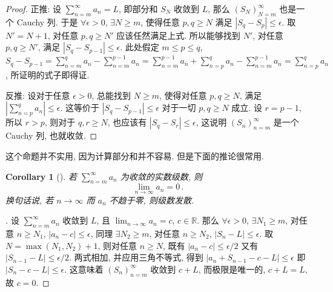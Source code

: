 \documentclass[UTF8]{ctexart}
\theoremstyle{mystyle}
\theoremstyle{myremark}
\theoremstyle{plain}
\newtheorem{corollary}{Corollary}[section]
\newcommand{\R}{\mathbb R}
\begin{document}
\begin{proof}
    正推: 设 $ \displaystyle \sum_{n = m}^\infty a_n = L $, 即部分和 $ S_N $ 收敛到 $ L $, 那么 $ (S_N)_{N = m}^\infty $ 也是一个 Cauchy 列. 于是 $ \forall \epsilon > 0 $, $ \exists N \geqslant m $, 使得任意 $ p, q \geqslant N $ 满足 $ |S_q - S_p| \leqslant \epsilon $. 取 $ N' = N + 1 $, 对任意 $ p, q \geqslant N' $ 应该任然满足上式. 所以能够找到 $ N' $, 对任意 $ p, q \geqslant N' $, 满足 $ |S_q - S_{p - 1}| \leqslant \epsilon $. 此处假定 $ m \leqslant p \leqslant q $, $ \displaystyle S_q - S_{p - 1} = \sum_{n = m}^{q} a_n - \sum_{n = m}^{p - 1} a_n = \sum_{n = m}^{p - 1} a_n + \sum_{n = p}^q a_n - \sum_{n = m}^{p - 1} a_n = \sum_{n = p}^q a_n $, 所证明的式子即得证.
    
    反推: 设对于任意 $ \epsilon > 0 $, 总能找到 $ N \geqslant m $, 使得对任意 $ p, q \geqslant N $, 满足 $ \displaystyle \left| \sum_{n = p}^q a_n \right| \leqslant \epsilon $. 这等价于 $ |S_q - S_{p - 1}| \leqslant \epsilon $ 对于一切 $ p, q \geqslant N $ 成立. 设 $ r = p - 1 $, 所以 $ r > p $, 则对于 $ q, r \geqslant N $, 也应该有 $ |S_q - S_r| \leqslant \epsilon $, 这说明 $ (S_n)_{n = m}^\infty $ 是一个 Cauchy 列, 也就收敛.
\end{proof}

这个命题并不实用, 因为计算部分和并不容易. 但是下面的推论很常用.

\begin{corollary}[] 
    若 $ \displaystyle \sum_{n = m}^\infty a_n $ 为收敛的实数级数, 则 \[ \lim_{n \to \infty} a_n = 0 \,.\] 换句话说, 若 $ n \to \infty $ 而 $ a_n $ 不趋于零, 则级数发散.
\end{corollary}

\begin{proof}[]
    设 $ \displaystyle \sum_{n = m}^\infty a_n $ 收敛到 $ L $, 且 $ \displaystyle \lim_{n \to \infty} a_n = c $, $ c \in \R $. 那么 $ \forall \epsilon > 0 $, $ \exists N_1 \geqslant m $, 对任意 $ n \geqslant N_1 $, $ |a_n - c| \leqslant \epsilon $, 同理 $ \exists N_2 \geqslant m $, 对任意 $ n \geqslant N_2 $, $ |S_n - L| \leqslant \epsilon $. 取 $ N = \max(N_1, N_2) + 1 $, 则对任意 $ n \geqslant N $, 既有 $ |a_n - c| \leqslant \epsilon / 2 $ 又有 $ |S_{n - 1} - L| \leqslant \epsilon / 2 $. 两式相加, 并应用三角不等式, 得到 $ |a_n + S_{n - 1} - c - L| \leqslant \epsilon $ 即 $ |S_n - c - L| \leqslant \epsilon $. 这意味着 $ (S_n)_{n = m}^\infty $ 收敛到 $ c + L $, 而极限是唯一的, $ c + L = L $, 故 $ c = 0 $.
\end{proof}
\end{document}
